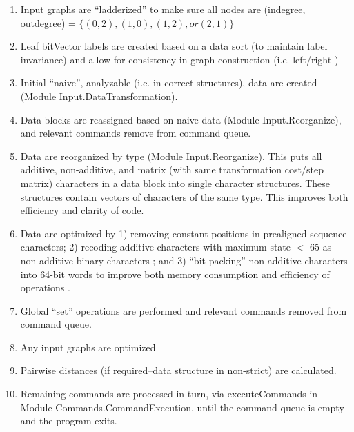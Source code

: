 \documentclass[11pt]{article}
\begin{document}
\begin{enumerate}
		\item{Input graphs are ``ladderized'' to make sure all nodes are (indegree, outdegree) = $\{(0,2), (1,0), (1,2), or (2,1)\}$}
		
		\item{Leaf bitVector labels are created based on a data sort (to maintain label invariance) and allow for consistency 
			in graph construction (i.e. left/right \cite{WashburnandWheeler2020})}
		
		\item{Initial ``naive'', analyzable (i.e. in correct structures), data are created (Module Input.DataTransformation).}
		
		\item{Data blocks are reassigned based on naive data (Module Input.Reorganize), and relevant commands remove from command queue.}
		
		\item{Data are reorganized by type (Module Input.Reorganize).  This puts all additive, non-additive, and matrix (with same 
			transformation cost/step matrix) characters in a data block into single character structures.  These structures contain vectors of 
			characters of the same type.  
			This improves both efficiency and clarity of code.} 
		
		\item{Data are optimized by 1) removing constant positions in prealigned sequence characters; 2) recoding additive characters with maximum state $<$ 65 
			 as non-additive binary characters \cite{Farris1970}; and 3) ``bit packing'' non-additive characters into 64-bit words to improve both memory consumption
			 and efficiency of operations \cite{Ronquist1998, moilanen1999, goloboff2002, WhiteandHolland2011}.}
		
		\item{Global ``set'' operations are performed and relevant commands
			removed from command queue.}
		
		\item{Any input graphs are optimized}
		
		\item{Pairwise distances (if required--data structure in non-strict) are calculated.}
		
		\item{Remaining commands are processed in turn, via executeCommands in Module Commands.CommandExecution, until the command queue is empty
			and the program exits.}
		
	\end{enumerate} 
	
\end{document}
